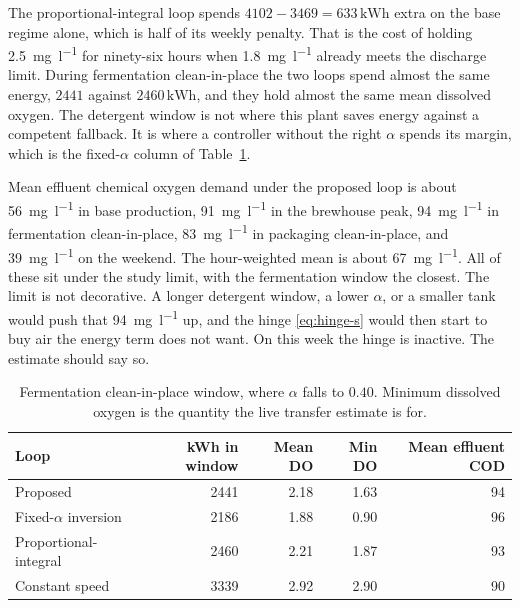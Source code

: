 The proportional-integral loop spends $4102-3469=633\,\mathrm{kWh}$ extra on the base regime alone, which is half of its weekly penalty. That is the cost of holding \SI{2.5}{\milli\gram\per\litre} for ninety-six hours when \SI{1.8}{\milli\gram\per\litre} already meets the discharge limit. During fermentation clean-in-place the two loops spend almost the same energy, $2441$ against $2460\,\mathrm{kWh}$, and they hold almost the same mean dissolved oxygen. The detergent window is not where this plant saves energy against a competent fallback. It is where a controller without the right $\alpha$ spends its margin, which is the fixed-$\alpha$ column of Table~\ref{tab:do-cip}.

Mean effluent chemical oxygen demand under the proposed loop is about \SI{56}{\milli\gram\per\litre} in base production, \SI{91}{\milli\gram\per\litre} in the brewhouse peak, \SI{94}{\milli\gram\per\litre} in fermentation clean-in-place, \SI{83}{\milli\gram\per\litre} in packaging clean-in-place, and \SI{39}{\milli\gram\per\litre} on the weekend. The hour-weighted mean is about \SI{67}{\milli\gram\per\litre}. All of these sit under the study limit, with the fermentation window the closest. The limit is not decorative. A longer detergent window, a lower $\alpha$, or a smaller tank would push that \SI{94}{\milli\gram\per\litre} up, and the hinge \eqref{eq:hinge-s} would then start to buy air the energy term does not want. On this week the hinge is inactive. The estimate should say so.

\begin{table}[ht]
\centering
\caption{Fermentation clean-in-place window, where $\alpha$ falls to $0.40$. Minimum dissolved oxygen is the quantity the live transfer estimate is for.}
\label{tab:do-cip}
\begin{tabular}{@{}lrrrr@{}}
\toprule
Loop & kWh in window & Mean DO & Min DO & Mean effluent COD \\
\midrule
Proposed & 2441 & 2.18 & 1.63 & 94 \\
Fixed-$\alpha$ inversion & 2186 & 1.88 & 0.90 & 96 \\
Proportional-integral & 2460 & 2.21 & 1.87 & 93 \\
Constant speed & 3339 & 2.92 & 2.90 & 90 \\
\bottomrule
\end{tabular}
\end{table}

